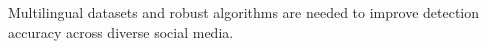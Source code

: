 Multilingual datasets and robust algorithms are needed to improve detection accuracy across diverse social media.
